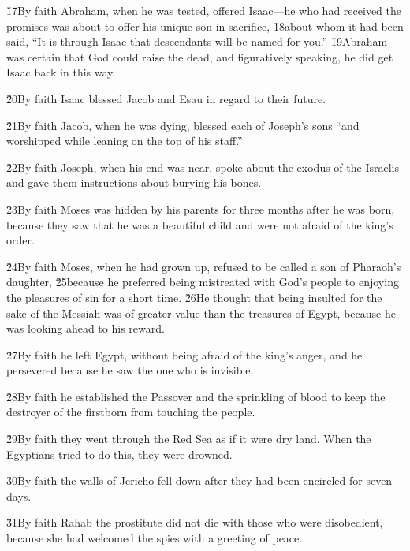 \v{17}By faith Abraham, when he was tested, offered Isaac---he who had received the promises was about to offer his unique son in sacrifice, \v{18}about whom it had been said, ``It is through Isaac that descendants will be named for you.'' \v{19}Abraham was certain that God could raise the dead, and figuratively speaking, he did get Isaac back in this way.

\v{20}By faith Isaac blessed Jacob and Esau in regard to their future.

\v{21}By faith Jacob, when he was dying, blessed each of Joseph's sons ``and worshipped while leaning on the top of his staff.''

\v{22}By faith Joseph, when his end was near, spoke about the exodus of the Israelis and gave them instructions about burying his bones.

\v{23}By faith Moses was hidden by his parents for three months after he was born, because they saw that he was a beautiful child and were not afraid of the king's order.

\v{24}By faith Moses, when he had grown up, refused to be called a son of Pharaoh's daughter, \v{25}because he preferred being mistreated with God's people to enjoying the pleasures of sin for a short time. \v{26}He thought that being insulted for the sake of the Messiah was of greater value than the treasures of Egypt, because he was looking ahead to his reward.

\v{27}By faith he left Egypt, without being afraid of the king's anger, and he persevered because he saw the one who is invisible.

\v{28}By faith he established the Passover and the sprinkling of blood to keep the destroyer of the firstborn from touching the people.

\v{29}By faith they went through the Red Sea as if it were dry land. When the Egyptians tried to do this, they were drowned.

\v{30}By faith the walls of Jericho fell down after they had been encircled for seven days.

\v{31}By faith Rahab the prostitute did not die with those who were disobedient, because she had welcomed the spies with a greeting of peace.

